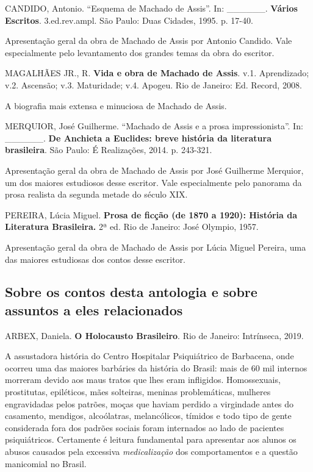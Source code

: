 \documentclass{extarticle}
\begin{document}
CANDIDO, Antonio. ``Esquema de Machado de Assis''. In: \_\_\_\_\_\_.
\textbf{Vários Escritos}. 3.ed.rev.ampl. São Paulo: Duas Cidades, 1995.
p. 17-40.

Apresentação geral da obra de Machado de Assis por Antonio Candido. Vale
especialmente pelo levantamento dos grandes temas da obra do escritor.

MAGALHÃES JR., R. \textbf{Vida e obra de Machado de Assis}. v.1.
Aprendizado; v.2. Ascensão; v.3. Maturidade; v.4. Apogeu. Rio de
Janeiro: Ed. Record, 2008.

A biografia mais extensa e minuciosa de Machado de Assis.

MERQUIOR, José Guilherme. ``Machado de Assis e a prosa impressionista''.
In: \_\_\_\_\_\_. \textbf{De Anchieta a Euclides: breve história da
literatura brasileira}. São Paulo: É Realizações, 2014. p. 243-321.

Apresentação geral da obra de Machado de Assis por José Guilherme
Merquior, um dos maiores estudiosos desse escritor. Vale especialmente
pelo panorama da prosa realista da segunda metade do século XIX.

PEREIRA, Lúcia Miguel. \textbf{Prosa de ficção (de 1870 a 1920):
História da Literatura Brasileira.} 2ª ed. Rio de Janeiro: José Olympio,
1957.

Apresentação geral da obra de Machado de Assis por Lúcia Miguel Pereira,
uma das maiores estudiosas dos contos desse escritor.

\subsection{Sobre os contos desta antologia e sobre assuntos a eles relacionados}

ARBEX, Daniela. \textbf{O Holocausto Brasileiro}. Rio de Janeiro:
Intrínseca, 2019.

A assustadora história do Centro Hospitalar Psiquiátrico de Barbacena,
onde ocorreu uma das maiores barbáries da história do Brasil: mais de 60
mil internos morreram devido aos maus tratos que lhes eram infligidos.
Homossexuais, prostitutas, epiléticos, mães solteiras, meninas
problemáticas, mulheres engravidadas pelos patrões, moças que haviam
perdido a virgindade antes do casamento, mendigos, alcoólatras,
melancólicos, tímidos e todo tipo de gente considerada fora dos padrões
sociais foram internados ao lado de pacientes psiquiátricos. Certamente
é leitura fundamental para apresentar aos alunos os abusos causados pela
excessiva \emph{medicalização} dos comportamentos e a questão manicomial
no Brasil.
\end{document}
